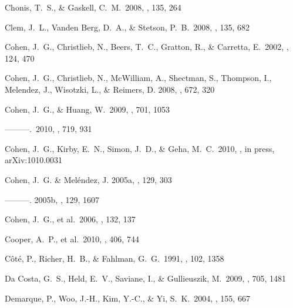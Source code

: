 \documentclass{emulateapj}
\begin{document}
\begin{thebibliography}{}
 Chonis, T.~S., \& Gaskell,
  C.~M.\ 2008, \aj, 135, 264

 Clem, J.~L., Vanden Berg, D.~A., \&
  Stetson, P.~B.\ 2008, \aj, 135, 682


 Cohen, J.~G., Christlieb, N.,
  Beers, T.~C., Gratton, R., \& Carretta, E.\ 2002, \aj, 124, 470

 Cohen, J.~G., Christlieb, N.,
  McWilliam, A., Shectman, S., Thompson, I., Melendez, J., Wisotzki,
  L., \& Reimers, D. 2008, \apj, 672, 320

 Cohen, J.~G., \& Huang, W.\
2009, \apj, 701, 1053

 ---------.\ 2010, \apj, 719, 931

 Cohen, J.~G., Kirby, E.~N.,
  Simon, J.~D., \& Geha, M.~C.\ 2010, \apj, in press, arXiv:1010.0031

 Cohen, J.~G. \&
  Mel{\'e}ndez, J. 2005a, \aj, 129, 303

 ---------. 2005b, \aj,
  129, 1607

 Cohen, J.~G., et al.\ 2006, \aj,
  132, 137

 Cooper, A.~P., et al.\ 2010,
  \mnras, 406, 744

 C{\^o}t{\'e}, P., Richer, H.~B., \&
  Fahlman, G.~G.\ 1991, \aj, 102, 1358


 Da Costa, G.~S., Held, 
E.~V., Saviane, I., \& Gullieuszik, M.\ 2009, \apj, 705, 1481 


 Demarque, P., Woo, J.-H., Kim,
  Y.-C., \& Yi, S.~K.\ 2004, \apjs, 155, 667



\end{thebibliography}
\end{document}

